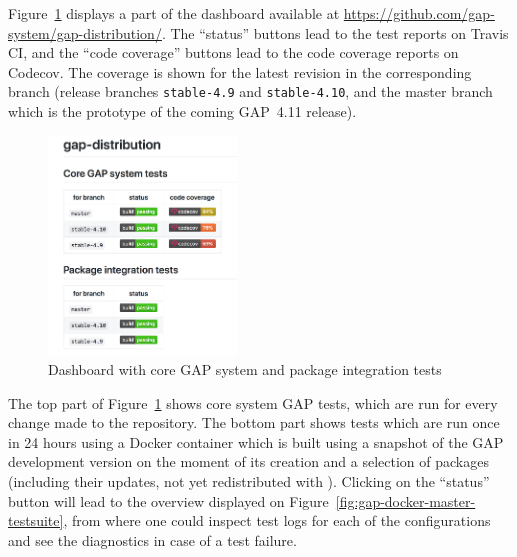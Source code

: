 \documentclass{deliverablereport}
\begin{document}

Figure~\ref{fig:gap-core-tests} displays a part of the dashboard
available at \url{https://github.com/gap-system/gap-distribution/}.
The ``status'' buttons lead to the test reports on Travis CI, and
the ``code coverage'' buttons lead to the code coverage reports on
Codecov. The coverage is shown for the latest revision in the
corresponding branch (release branches {\tt stable-4.9} and {\tt stable-4.10},
and the master branch which is the prototype of the coming GAP~4.11 release).

\begin{figure}[!ht]
    \centering
    \includegraphics[width=5cm]{images/gap-core-tests}
    \caption{Dashboard with core GAP system and package integration tests}
    \label{fig:gap-core-tests}
\end{figure}

The top part of Figure~\ref{fig:gap-core-tests} shows core system GAP tests,
which are run for every change made to the repository. The bottom part shows
tests which are run once in 24 hours using a Docker container which is built
using a snapshot of the GAP development version on the moment of its creation
and a selection of \GAP packages (including their updates, not yet redistributed
with \GAP). Clicking on the ``status'' button will lead to the overview displayed
on Figure~\ref{fig:gap-docker-master-testsuite}, from where one could inspect
test logs for each of the configurations and see the diagnostics in case of a
test failure.
\end{document}
